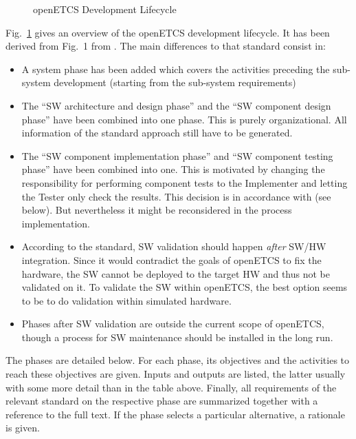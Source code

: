 \documentclass{template/openetcs_article}
\begin{document}
\begin{figure}[hbt]
  \centering
  \def\svgwidth{.9\textwidth}
  {\tiny
  }
  \caption{openETCS Development Lifecycle}
  \label{fig:lifecycle2}
\end{figure}

Fig.~\ref{fig:lifecycle2} gives an overview of the openETCS
development lifecycle. It has been derived from Fig.~1 from
\cite{EN50128:2011}. The main differences to that standard consist in:
\begin{itemize}
\item A system phase has been added which covers the activities preceding
  the sub-system development (starting from the sub-system requirements)
\item The ``SW architecture and design phase'' and the ``SW component
  design phase'' have been combined into one phase. This is purely
  organizational. All information of the standard approach still have
  to be generated.
\item The ``SW component implementation phase'' and ``SW component
  testing phase'' have been combined into one. This is motivated by
  changing the responsibility for performing component tests to the
  Implementer and letting the Tester only check the results. This
  decision is in accordance with \cite[6.1.4.1 to
  6.1.4.5]{EN50128:2011} (see below). But nevertheless it might be
  reconsidered in the process implementation.
\item According to the standard, SW validation should happen
  \emph{after} SW/HW integration. Since it would contradict the goals
  of openETCS to fix the hardware, the SW cannot be deployed to the
  target HW and thus not be validated on it. To validate the SW within
  openETCS, the best option seems to be to do validation within
  simulated hardware.
\item Phases after SW validation are outside the current scope of
  openETCS, though a process for SW maintenance should be installed in
  the long run.
\end{itemize}

The phases are detailed below. For each phase, its objectives and the
activities to reach these objectives are given. Inputs and outputs are
listed, the latter usually with some more detail than in the table
above. Finally, all requirements of the relevant standard on the
respective phase are summarized together with a reference to the full
text. If the phase selects a particular alternative, a rationale is
given.
\end{document}
